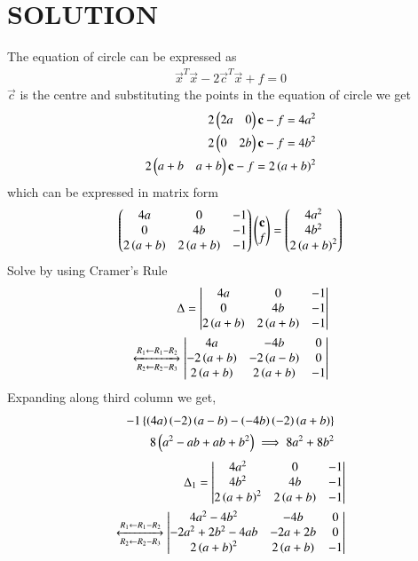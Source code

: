 \documentclass[journal,12pt,twocolumn]{IEEEtran}
\begin{document}
\section{SOLUTION}
The equation of circle can be expressed as
\begin{align}
    \vec{x}^T\vec{x}-2\vec{c}^T\vec{x}+f = 0
\end{align}
$\vec{c}$ is the centre  and substituting the points in the equation of circle we get
\begin{align}
2\begin{pmatrix}2a&0\end{pmatrix}\mathbf{c}-f=4a^2\\
2\begin{pmatrix}0&2b\end{pmatrix}\mathbf{c}-f=4b^2\\
2\begin{pmatrix}a+b&a+b\end{pmatrix}\mathbf{c}-f=2\left(a+b\right)^2
\end{align}
which can be expressed in matrix form
\begin{align}
\begin{pmatrix}4a&0&-1\\0&4b&-1\\2\left(a+b\right)&2\left(a+b\right)&-1\end{pmatrix}\begin{pmatrix}\mathbf{c}\\f\end{pmatrix} = \begin{pmatrix}4a^2\\4b^2\\2\left(a+b\right)^2\end{pmatrix}
\end{align}
Solve by using Cramer's Rule
\begin{align}
    \Delta = \begin{vmatrix}4a&0&-1\\0&4b&-1\\2\left(a+b\right)&2\left(a+b\right)&-1\end{vmatrix}\\
    \xleftrightarrow[R_2\leftarrow R_2-R_3]{R_1\leftarrow R_1-R_2}
    \begin{vmatrix}4a & -4b  & 0 \\-2\left(a+b\right) & -2\left(a-b\right) & 0 \\2\left(a+b\right) & 2\left(a+b\right) & -1\end{vmatrix}
    \end{align}
Expanding  along third column we get, 
\begin{align}
-1\left\{\left(4a\right)\left(-2\right)\left(a-b\right) - \left(-4b\right)\left(-2\right)\left(a+b\right)\right\}\\
8\left(a^2-ab+ab+b^2\right)\implies 8a^2+8b^2\label{eq:1}
\end{align}
\begin{align}
\Delta_{1} =\begin{vmatrix}4a^2 & 0 & -1 \\4b^2 & 4b & -1 \\ 2\left(a+b\right)^2 & 2\left(a+b\right) & -1\end{vmatrix}\\
    \xleftrightarrow[R_2\leftarrow R_2-R_3]{R_1\leftarrow R_1-R_2}
    \begin{vmatrix}4a^2-4b^2 & -4b & 0 \\-2a^2+2b^2-4ab & -2a+2b & 0 \\2\left(a+b\right)^2 & 2\left(a+b\right) & -1\end{vmatrix}
\end{align}
\end{document}
